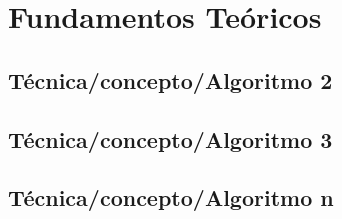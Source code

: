 \section{Fundamentos Te\'oricos}
\lipsum[0-1]

\subsection{T\'ecnica/concepto/Algoritmo 2}
\subsection{T\'ecnica/concepto/Algoritmo 3}
\subsection{T\'ecnica/concepto/Algoritmo n}

